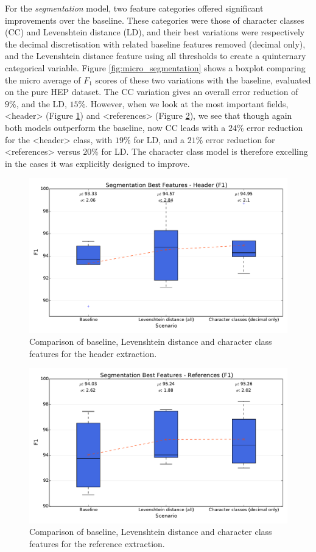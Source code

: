 For the \emph{segmentation} model, two feature categories offered significant improvements over the baseline. These categories were those of character classes (CC) and Levenshtein distance (LD), and their best variations were respectively the decimal discretisation with related baseline features removed (decimal only), and the Levenshtein distance feature using all thresholds to create a quinternary categorical variable. Figure \ref{fig:micro_segmentation} shows a boxplot comparing the micro average of $F_1$ scores of these two variations with the baseline, evaluated on the pure HEP dataset. The CC variation gives an overall error reduction of $9\%$, and the LD, $15\%$. However, when we look at the most important fields, <header> (Figure \ref{fig:header}) and <references> (Figure \ref{fig:references}), we see that though again both models outperform the baseline, now CC leads with a $24\%$ error reduction for the <header> class, with $19\%$ for LD, and a $21\%$ error reduction for <references> versus $20\%$ for LD. The character class model is therefore excelling in the cases it was explicitly designed to improve.

\begin{figure}[t]
\center
\includegraphics[width=5.5in]{Figures/header.pdf}
\caption{Comparison of baseline, Levenshtein distance and character class features for the header extraction.}
\label{fig:header}
\end{figure}

\begin{figure}[b]
\center
\includegraphics[width=5.5in]{Figures/references.pdf}
\caption{Comparison of baseline, Levenshtein distance and character class features for the reference extraction.}
\label{fig:references}
\end{figure}


